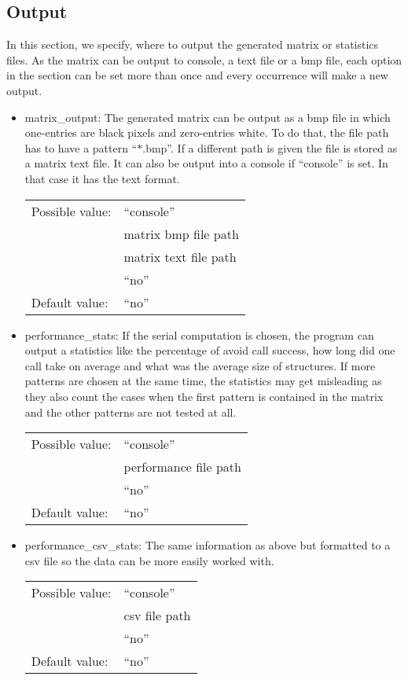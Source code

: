 \subsection{Output}
In this section, we specify, where to output the generated matrix or statistics files. As the matrix can be output to console, a text file or a bmp file, each option in the section can be set more than once and every occurrence will make a new output.
\begin{itemize}
\item matrix\_output: The generated matrix can be output as a bmp file in which one-entries are black pixels and zero-entries white. To do that, the file path has to have a pattern ``$\ast$.bmp''. If a different path is given the file is stored as a matrix text file. It can also be output into a console if ``console'' is set. In that case it has the text format.

\begin{tabular}{ll}
Possible value: & ``console'' \\
& matrix bmp file path \\
& matrix text file path \\
& ``no'' \\
Default value: & ``no''
\end{tabular}

\item performance\_stats: If the serial computation is chosen, the program can output a statistics like the percentage of avoid call success, how long did one call take on average and what was the average size of structures. If more patterns are chosen at the same time, the statistics may get misleading as they also count the cases when the first pattern is contained in the matrix and the other patterns are not tested at all.

\begin{tabular}{ll}
Possible value: & ``console'' \\
& performance file path \\
& ``no'' \\
Default value: & ``no''
\end{tabular}

\item performance\_csv\_stats: The same information as above but formatted to a csv file so the data can be more easily worked with.

\begin{tabular}{ll}
Possible value: & ``console'' \\
& csv file path \\
& ``no'' \\
Default value: & ``no''
\end{tabular}


\end{itemize}
